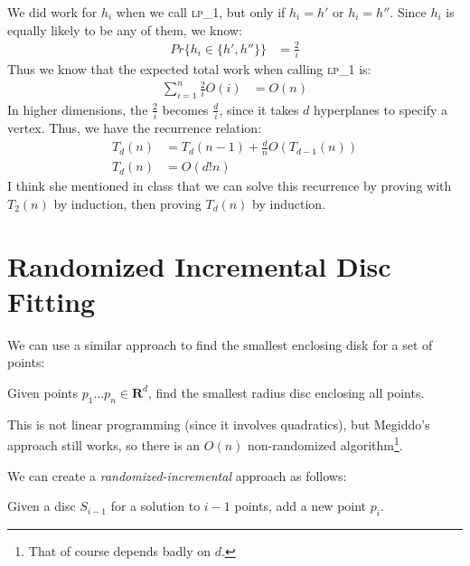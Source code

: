 \begin{enumerate}
                    We did work for $h_i$ when we call \textsc{lp\_1}, but only if $h_i = h'$ or $h_i = h''$.
                    Since $h_i$ is equally likely to be any of them, we know:
                    \begin{align*}
                        Pr\{ h_i \in \{h', h''\} \} &= \frac{2}{i}
                    \end{align*}
                    Thus we know that the expected total work when calling \textsc{lp\_1} is:
                    \begin{align*}
                        \sum_{i=1}^n \frac{2}{i} O(i) &= O(n)
                    \end{align*}
                    In higher dimensions, the $\frac{2}{i}$ becomes $\frac{d}{i}$, since it takes $d$ hyperplanes to specify a vertex.
                    Thus, we have the recurrence relation:
                    \begin{align*}
                        T_d(n) &= T_d(n-1) + \frac{d}{n} O \left(T_{d-1}(n) \right) \\
                        T_d(n) &= O(d! n)
                    \end{align*}
                    I think she mentioned in class that we can solve this recurrence by proving with $T_2(n)$ by induction, then proving $T_d(n)$ by induction.
                \end{enumerate}
            \section{Randomized Incremental Disc Fitting} %
            \label{sec:randomized_incremental_disc_fitting}
                We can use a similar approach to find the smallest enclosing disk for a set of points:

                Given points $p_1 \ldots p_n \in \mathbf{R}^d$, find the smallest radius disc enclosing all points.

                This is not linear programming (since it involves quadratics), but Megiddo's approach still works, so there is an $O(n)$ non-randomized algorithm\footnote{That of course depends badly on $d$.}.

                We can create a \textit{randomized-incremental} approach as follows:

                Given a disc $S_{i-1}$ for a solution to $i-1$ points, add a new point $p_i$.

